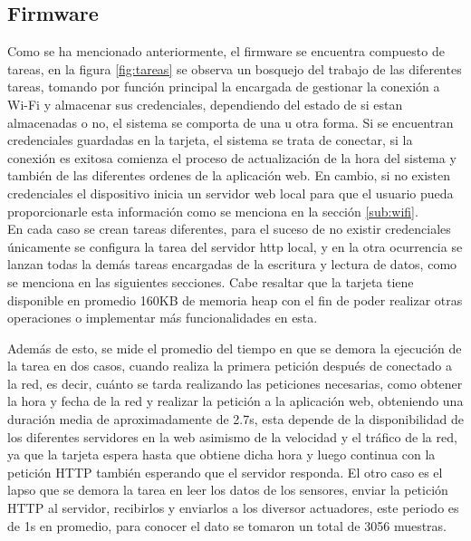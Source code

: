 \begin{frame}
\end{frame}


\subsection{Firmware}
\begin{frame}

Como se ha mencionado anteriormente, el firmware se encuentra compuesto de tareas, en la figura \ref{fig:tareas} se observa un bosquejo del trabajo de las diferentes tareas, tomando por función principal la encargada de gestionar la conexión a Wi-Fi y almacenar sus credenciales, dependiendo del estado de si estan almacenadas o no, el sistema se comporta de una u otra forma. Si se encuentran credenciales guardadas en la tarjeta, el sistema se trata de conectar, si la conexión es exitosa comienza el proceso de actualización de la hora del sistema y también de las diferentes ordenes de la aplicación web. En cambio, si no existen credenciales el dispositivo inicia un servidor web local para que el usuario pueda proporcionarle esta información como se menciona en la sección \ref{sub:wifi}.\\

En cada caso se crean tareas diferentes, para el suceso de no existir credenciales únicamente se configura la tarea del servidor http local, y en la otra ocurrencia se lanzan todas la demás tareas encargadas de la escritura y lectura de datos, como se menciona en las siguientes secciones. Cabe resaltar que la tarjeta tiene disponible en promedio 160KB de memoria heap con el fin de poder realizar otras operaciones o implementar más funcionalidades en esta.\\

\end{frame}

\begin{frame}
Además de esto, se mide el promedio del tiempo en que se demora la ejecución de la tarea en dos casos, cuando realiza la primera petición después de conectado a la red, es decir, cuánto se tarda realizando las peticiones necesarias, como obtener la hora y fecha de la red y realizar la petición a la aplicación web, obteniendo una duración media de aproximadamente de 2.7s, esta depende de la disponibilidad de los diferentes servidores en la web asimismo de la velocidad y el tráfico de la red, ya que la tarjeta espera hasta que obtiene dicha hora y luego continua con la petición HTTP también esperando que el servidor responda. El otro caso es el lapso que se demora la tarea en leer los datos de los sensores, enviar la petición HTTP al servidor, recibirlos y enviarlos a los diversor actuadores, este periodo es de 1s en promedio, para conocer el dato se tomaron un total de 3056 muestras.
\end{frame}


